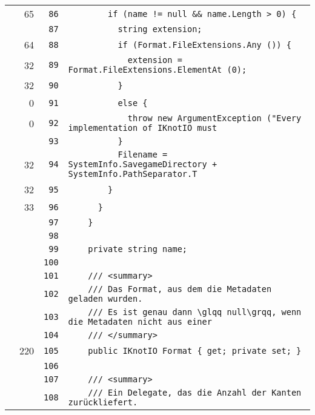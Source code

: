 \documentclass[a4paper,10pt]{article}
\begin{document}
\begin{longtable}[l]{lrrl}
\cellcolor{green} & 65 & \verb~86~ & \verb~        if (name != null && name.Length > 0) {~\\
\cellcolor{gray} &  & \verb~87~ & \verb~          string extension;~\\
\cellcolor{green} & 64 & \verb~88~ & \verb~          if (Format.FileExtensions.Any ()) {~\\
\cellcolor{green} & 32 & \verb~89~ & \verb~            extension = Format.FileExtensions.ElementAt (0);~\\
\cellcolor{green} & 32 & \verb~90~ & \verb~          }~\\
\cellcolor{red} & 0 & \verb~91~ & \verb~          else {~\\
\cellcolor{red} & 0 & \verb~92~ & \verb~            throw new ArgumentException ("Every implementation of IKnotIO must~\\
\cellcolor{gray} &  & \verb~93~ & \verb~          }~\\
\cellcolor{green} & 32 & \verb~94~ & \verb~          Filename = SystemInfo.SavegameDirectory + SystemInfo.PathSeparator.T~\\
\cellcolor{green} & 32 & \verb~95~ & \verb~        }~\\
\cellcolor{green} & 33 & \verb~96~ & \verb~      }~\\
\cellcolor{gray} &  & \verb~97~ & \verb~    }~\\
\cellcolor{gray} &  & \verb~98~ & \verb~~\\
\cellcolor{gray} &  & \verb~99~ & \verb~    private string name;~\\
\cellcolor{gray} &  & \verb~100~ & \verb~~\\
\cellcolor{gray} &  & \verb~101~ & \verb~    /// <summary>~\\
\cellcolor{gray} &  & \verb~102~ & \verb~    /// Das Format, aus dem die Metadaten geladen wurden.~\\
\cellcolor{gray} &  & \verb~103~ & \verb~    /// Es ist genau dann \glqq null\grqq, wenn die Metadaten nicht aus einer ~\\
\cellcolor{gray} &  & \verb~104~ & \verb~    /// </summary>~\\
\cellcolor{green} & 220 & \verb~105~ & \verb~    public IKnotIO Format { get; private set; }~\\
\cellcolor{gray} &  & \verb~106~ & \verb~~\\
\cellcolor{gray} &  & \verb~107~ & \verb~    /// <summary>~\\
\cellcolor{gray} &  & \verb~108~ & \verb~    /// Ein Delegate, das die Anzahl der Kanten zurückliefert.~\\

\end{longtable}
\end{document}
